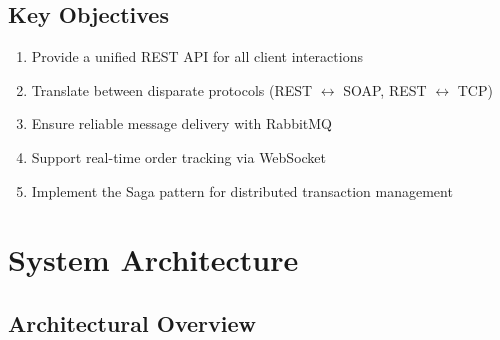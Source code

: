 \documentclass[12pt,a4paper]{article}
\begin{document}
\subsection{Key Objectives}
\begin{enumerate}[leftmargin=2cm]
  \item Provide a unified REST API for all client interactions
  \item Translate between disparate protocols (REST $\leftrightarrow$ SOAP, REST $\leftrightarrow$ TCP)
  \item Ensure reliable message delivery with RabbitMQ
  \item Support real-time order tracking via WebSocket
  \item Implement the Saga pattern for distributed transaction management
\end{enumerate}

\section{System Architecture}

\subsection{Architectural Overview}
\end{document}
